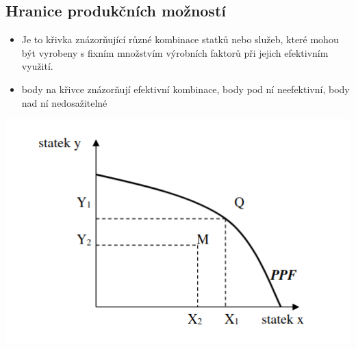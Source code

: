 \subsection{Hranice produkčních možností}
\begin{itemize}
    \item Je to křivka znázorňující různé kombinace statků nebo služeb, které mohou být vyrobeny s fixním množstvím výrobních faktorů při jejich efektivním využití.
    \item body na křivce znázorňují efektivní kombinace, body pod ní neefektivní, body nad ní nedosažitelné
\end{itemize}
\includegraphics[width=16cm]{images/hranice_vyrobnich_moznosti.png}